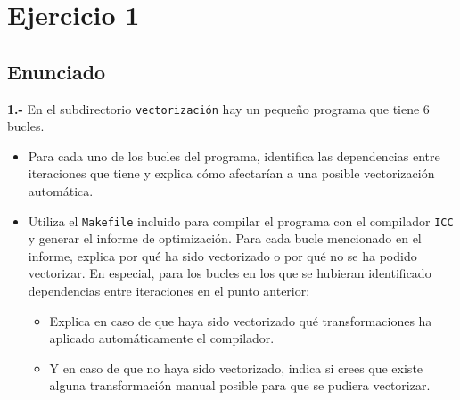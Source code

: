 \section{Ejercicio 1}
\subsection{Enunciado}
\begin{ejer}
    \textbf{1.-} En el subdirectorio \texttt{vectorización} hay un pequeño programa que tiene 6 bucles.
    \begin{itemize}
        \item Para cada uno de los bucles del programa, identifica las dependencias entre iteraciones que tiene
    y explica cómo afectarían a una posible vectorización automática.
        \item Utiliza el \texttt{Makefile} incluido para compilar el programa con el compilador \texttt{ICC} y generar
    el informe de optimización. Para cada bucle mencionado en el informe, explica por qué ha sido vectorizado o por qué no 
    se ha podido vectorizar. En especial, para los bucles en los que se hubieran identificado dependencias entre iteraciones
     en el punto anterior:
        \begin{itemize}
            \item Explica en caso de que haya sido vectorizado qué transformaciones ha aplicado automáticamente el compilador.
            \item Y en caso de que no haya sido vectorizado, indica si crees que existe alguna transformación manual posible para
            que se pudiera vectorizar.
        \end{itemize}
    \end{itemize}
\end{ejer}



